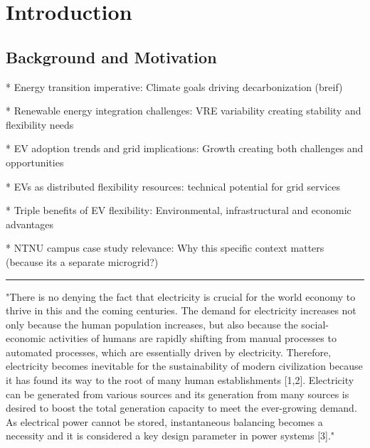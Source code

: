 \section{Introduction}


\subsection{Background and Motivation}

* Energy transition imperative: Climate goals driving decarbonization (breif)

* Renewable energy integration challenges: VRE variability creating stability and flexibility needs

* EV adoption trends and grid implications: Growth creating both challenges and opportunities

* EVs as distributed flexibility resources: technical potential for grid services

* Triple benefits of EV flexibility: Environmental, infrastructural and economic advantages

* NTNU campus case study relevance: Why this specific context matters (because its a separate microgrid?)

\hrule

"There is no denying the fact that electricity is crucial for the world economy to thrive in this and the coming centuries. The demand for electricity increases not only because the human population increases, but also because the social-economic activities of humans are rapidly shifting from manual processes to automated processes, which are essentially driven by electricity. Therefore, electricity becomes inevitable for the sustainability of modern civilization because it has found its way to the root of many human establishments [1,2]. Electricity can be generated from various sources and its generation from many sources is desired to boost the total generation capacity to meet the ever-growing demand. As electrical power cannot be stored, instantaneous balancing becomes a necessity and it is considered a key design parameter in power systems [3]." \cite{salman_review_2022}

